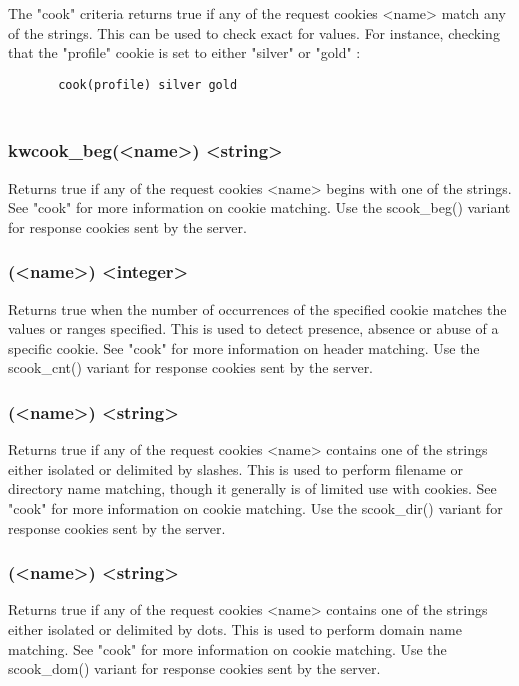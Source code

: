   The "cook" criteria returns true if any of the request cookies <name> match
  any of the strings. This can be used to check exact for values. For instance,
  checking that the "profile" cookie is set to either "silver" or "gold" :
  \begin{verbatim}
       cook(profile) silver gold
  \end{verbatim}

\subsubsection[cook\_beg]{\\kw{cook\_beg}(<name>) <string>}

  Returns true if any of the request cookies <name> begins with one of the
  strings. See "cook" for more information on cookie matching. Use the
  scook\_beg() variant for response cookies sent by the server.

\subsubsection[cook\_cnt]{(<name>) <integer>}

  Returns true when the number of occurrences of the specified cookie matches
  the values or ranges specified. This is used to detect presence, absence or
  abuse of a specific cookie. See "cook" for more information on header
  matching. Use the scook\_cnt() variant for response cookies sent by the
  server.

\subsubsection[cook\_dir]{(<name>) <string>}

  Returns true if any of the request cookies <name> contains one of the strings
  either isolated or delimited by slashes. This is used to perform filename or
  directory name matching, though it generally is of limited use with cookies.
  See "cook" for more information on cookie matching. Use the scook\_dir()
  variant for response cookies sent by the server.

\subsubsection[cook\_dom]{(<name>) <string>}

  Returns true if any of the request cookies <name> contains one of the strings
  either isolated or delimited by dots. This is used to perform domain name
  matching. See "cook" for more information on cookie matching. Use the
  scook\_dom() variant for response cookies sent by the server.

